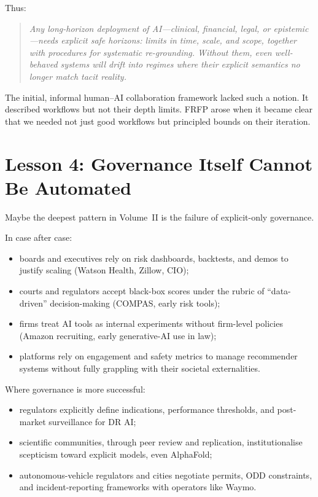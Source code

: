 Thus:

\begin{quote}
  \emph{Any long-horizon deployment of AI---clinical, financial, legal, or epistemic---needs explicit safe horizons:
  limits in time, scale, and scope, together with procedures for systematic re-grounding.
  Without them, even well-behaved systems will drift into regimes where their explicit semantics no longer match tacit reality.}
\end{quote}

The initial, informal human--AI collaboration framework lacked such a notion.
It described workflows but not their depth limits.
FRFP arose when it became clear that we needed not just good workflows but principled bounds on their iteration.

\section*{Lesson 4: Governance Itself Cannot Be Automated}

Maybe the deepest pattern in Volume~II is the failure of explicit-only governance.

In case after case:

\begin{itemize}
  \item boards and executives rely on risk dashboards, backtests, and demos to justify scaling (Watson Health, Zillow, CIO);
  \item courts and regulators accept black-box scores under the rubric of ``data-driven'' decision-making (COMPAS, early risk tools);
  \item firms treat AI tools as internal experiments without firm-level policies (Amazon recruiting, early generative-AI use in law);
  \item platforms rely on engagement and safety metrics to manage recommender systems without fully grappling with their societal externalities.
\end{itemize}

Where governance is more successful:

\begin{itemize}
  \item regulators explicitly define indications, performance thresholds, and post-market surveillance for DR AI;
  \item scientific communities, through peer review and replication, institutionalise scepticism toward explicit models, even AlphaFold;
  \item autonomous-vehicle regulators and cities negotiate permits, ODD constraints, and incident-reporting frameworks with operators like Waymo.
\end{itemize}

